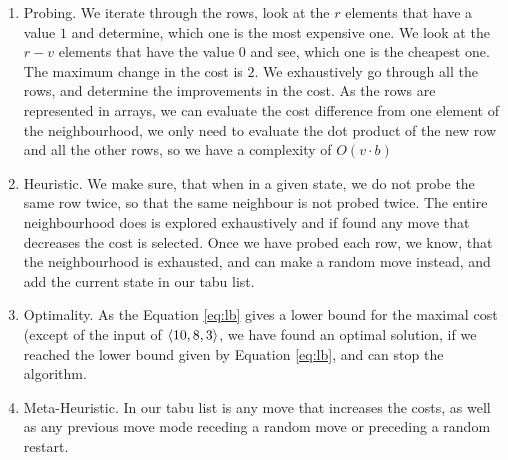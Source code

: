 \begin{enumerate}
\item Probing.  
We iterate through the rows, look at the $r$ elements that have a value $1$ and determine, which one is the most expensive one. We look at the $r-v$ elements that have the value $0$ and see, which one is the cheapest one. The maximum change in the \textsf{cost} is $2$. We exhaustively go through all the rows, and determine the improvements in the cost. 
As the rows are represented in arrays, we can evaluate the cost difference from one element of the neighbourhood, we only need to evaluate the dot product of the new row and all the other rows, so we have a complexity of $O(v \cdot b)$
\item Heuristic. We make sure, that when in a given state, we do not probe the same row twice, so that the same neighbour is not probed twice. The entire neighbourhood does is explored exhaustively and if found any move that decreases the cost is selected. Once we have probed each row, we know, that the neighbourhood is exhausted, and can make a random move instead, and add the current state in our tabu list. 
\item Optimality. As the Equation \ref{eq:lb} gives a lower bound for the maximal cost (except of the input of $\langle10, 8, 3\rangle$, we have found an optimal solution, if we reached the lower bound given by Equation \ref{eq:lb}, and can stop the algorithm. 
\item Meta-Heuristic. In our tabu list is any move that increases the costs, as well as any previous move mode receding a random move or preceding a random restart. 

\end{enumerate}
